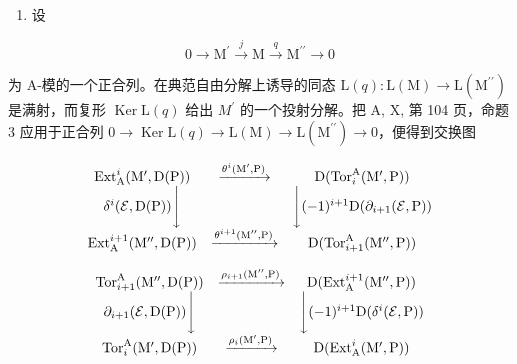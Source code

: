 \begin{enumerate}
\def\labelenumi{\arabic{enumi})}
\setcounter{enumi}{1}
\tightlist
\item
  设
\end{enumerate}

\[
0 \to \mathrm{M} ^ {\prime} \xrightarrow {j} \mathrm{M} \xrightarrow {q} \mathrm{M} ^ {\prime \prime} \to 0\tag{ℰ}
\]

为 A-模的一个正合列。在典范自由分解上诱导的同态 \(\mathrm{L}(q):\mathrm{L}(\mathrm{M})\to\mathrm{L}(\mathrm{M}^{\prime\prime})\) 是满射，而复形 \(\operatorname{Ker}\mathrm{L}(q)\) 给出 \(M^{\prime}\) 的一个投射分解。把 A, X, 第 104 页，命题 3 应用于正合列 \(0\to\operatorname{Ker}\mathrm{L}(q)\to\mathrm{L}(\mathrm{M})\to\mathrm{L}(\mathrm{M}^{\prime\prime})\to0\)，便得到交换图

\[
\begin{array}{c c c} \operatorname{Ext} _ {\mathrm{A}} ^ {i} (\mathrm{M} ^ {\prime}, \mathrm{D} (\mathrm{P})) & \xrightarrow {\theta^ {i} (\mathrm{M} ^ {\prime} , \mathrm{P})} & \mathrm{D} (\operatorname{Tor} _ {i} ^ {\mathrm{A}} (\mathrm{M} ^ {\prime}, \mathrm{P})) \\ \delta^ {i} (\mathcal {E}, \mathrm{D} (\mathrm{P})) \Bigg \downarrow & & \Bigg \downarrow (- 1) ^ {i + 1} \mathrm{D} (\partial_ {i + 1} (\mathcal {E}, \mathrm{P})) \\ \operatorname{Ext} _ {\mathrm{A}} ^ {i + 1} (\mathrm{M} ^ {\prime \prime}, \mathrm{D} (\mathrm{P})) & \xrightarrow {\theta^ {i + 1} (\mathrm{M} ^ {\prime \prime} , \mathrm{P})} & \mathrm{D} (\operatorname{Tor} _ {i + 1} ^ {\mathrm{A}} (\mathrm{M} ^ {\prime \prime}, \mathrm{P})) \end{array}
\]

\[
\begin{array}{c c c} \operatorname{Tor} _ {i + 1} ^ {\mathrm{A}} (\mathrm{M} ^ {\prime \prime}, \mathrm{D} (\mathrm{P})) & \xrightarrow {\rho_ {i + 1} (\mathrm{M} ^ {\prime \prime} , \mathrm{P})} & \mathrm{D} (\operatorname{Ext} _ {\mathrm{A}} ^ {i + 1} (\mathrm{M} ^ {\prime \prime}, \mathrm{P})) \\ \partial_ {i + 1} (\mathcal {E}, \mathrm{D} (\mathrm{P})) \Bigg \downarrow & & \Bigg \downarrow (- 1) ^ {i + 1} \mathrm{D} (\delta^ {i} (\mathcal {E}, \mathrm{P})) \\ \operatorname{Tor} _ {i} ^ {\mathrm{A}} (\mathrm{M} ^ {\prime}, \mathrm{D} (\mathrm{P})) & \xrightarrow {\rho_ {i} (\mathrm{M} ^ {\prime} , \mathrm{P})} & \mathrm{D} (\operatorname{Ext} _ {\mathrm{A}} ^ {i} (\mathrm{M} ^ {\prime}, \mathrm{P})) \end{array}
\]

